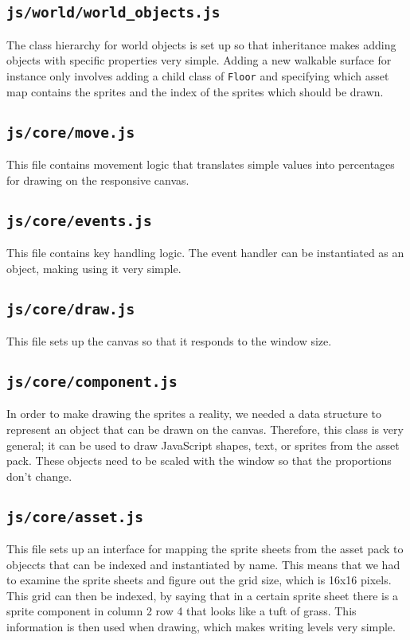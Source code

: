 \documentclass[11pt]{article}
\begin{document}
\subsection{\texttt{js/world/world\_objects.js}}
\label{sec:org93f4a3b}
The class hierarchy for world objects is set up so that inheritance makes adding objects with specific properties very simple. Adding a new walkable surface for instance only involves adding a child class of \texttt{Floor} and specifying which asset map contains the sprites and the index of the sprites which should be drawn.\\
\subsection{\texttt{js/core/move.js}}
\label{sec:org90fbbb0}
This file contains movement logic that translates simple values into percentages for drawing on the responsive canvas.\\
\subsection{\texttt{js/core/events.js}}
\label{sec:orgeca1307}
This file contains key handling logic. The event handler can be instantiated as an object, making using it very simple.\\
\subsection{\texttt{js/core/draw.js}}
\label{sec:org4617909}
This file sets up the canvas so that it responds to the window size.\\
\subsection{\texttt{js/core/component.js}}
\label{sec:org14de340}
In order to make drawing the sprites a reality, we needed a data structure to represent an object that can be drawn on the canvas. Therefore, this class is very general; it can be used to draw JavaScript shapes, text, or sprites from the asset pack. These objects need to be scaled with the window so that the proportions don't change.\\
\subsection{\texttt{js/core/asset.js}}
\label{sec:org2d5091c}
This file sets up an interface for mapping the sprite sheets from the asset pack to objeccts that can be indexed and instantiated by name. This means that we had to examine the sprite sheets and figure out the grid size, which is 16x16 pixels. This grid can then be indexed, by saying that in a certain sprite sheet there is a sprite component in column 2 row 4 that looks like a tuft of grass. This information is then used when drawing, which makes writing levels very simple.\\
\end{document}
